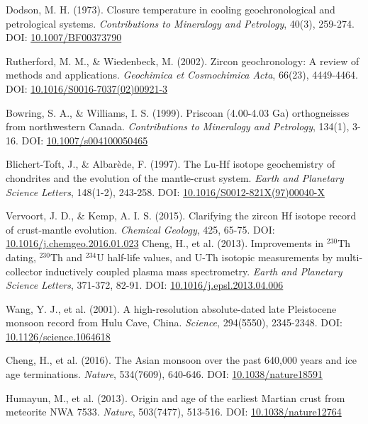 \documentclass{article}
\begin{document}
\begin{thebibliography}{9}
Dodson, M. H. (1973). Closure temperature in cooling geochronological and petrological systems. \textit{Contributions to Mineralogy and Petrology}, 40(3), 259-274. 
DOI: \href{https://doi.org/10.1007/BF00373790}{10.1007/BF00373790}

Rutherford, M. M., & Wiedenbeck, M. (2002). Zircon geochronology: A review of methods and applications. \textit{Geochimica et Cosmochimica Acta}, 66(23), 4449-4464. 
DOI: \href{https://doi.org/10.1016/S0016-7037(02)00921-3}{10.1016/S0016-7037(02)00921-3}

Bowring, S. A., \& Williams, I. S. (1999). Priscoan (4.00-4.03 Ga) orthogneisses from northwestern Canada. \textit{Contributions to Mineralogy and Petrology}, 134(1), 3-16.  
DOI: \href{https://doi.org/10.1007/s004100050465}{10.1007/s004100050465}


Blichert-Toft, J., \& Albarède, F. (1997). The Lu-Hf isotope geochemistry of chondrites and the evolution of the mantle-crust system. \textit{Earth and Planetary Science Letters}, 148(1-2), 243-258.  
DOI: \href{https://doi.org/10.1016/S0012-821X(97)00040-X}{10.1016/S0012-821X(97)00040-X}

Vervoort, J. D., \& Kemp, A. I. S. (2015). Clarifying the zircon Hf isotope record of crust-mantle evolution. \textit{Chemical Geology}, 425, 65-75.  
DOI: \href{https://doi.org/10.1016/j.chemgeo.2016.01.023}{10.1016/j.chemgeo.2016.01.023}
Cheng, H., et al. (2013). Improvements in \(^{230}\text{Th}\) dating, \(^{230}\text{Th}\) and \(^{234}\text{U}\) half-life values, and U-Th isotopic measurements by multi-collector inductively coupled plasma mass spectrometry. \textit{Earth and Planetary Science Letters}, 371-372, 82-91.  
DOI: \href{https://doi.org/10.1016/j.epsl.2013.04.006}{10.1016/j.epsl.2013.04.006}

Wang, Y. J., et al. (2001). A high-resolution absolute-dated late Pleistocene monsoon record from Hulu Cave, China. \textit{Science}, 294(5550), 2345-2348.  
DOI: \href{https://doi.org/10.1126/science.1064618}{10.1126/science.1064618}

Cheng, H., et al. (2016). The Asian monsoon over the past 640,000 years and ice age terminations. \textit{Nature}, 534(7609), 640-646.  
DOI: \href{https://doi.org/10.1038/nature18591}{10.1038/nature18591}

Humayun, M., et al. (2013). Origin and age of the earliest Martian crust from meteorite NWA 7533. \textit{Nature}, 503(7477), 513-516.  
DOI: \href{https://doi.org/10.1038/nature12764}{10.1038/nature12764}


\end{thebibliography}
\end{document}
